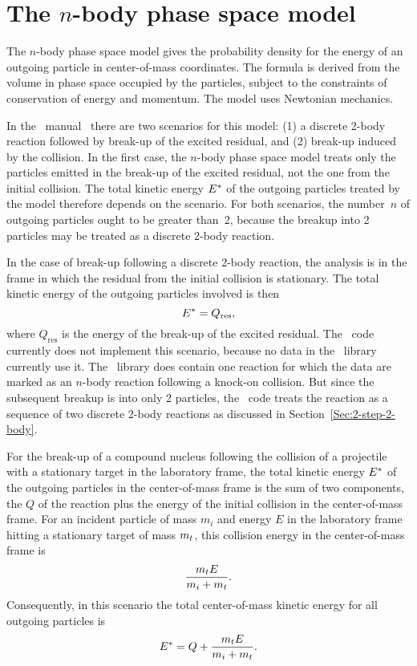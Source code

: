 \section{The $n$-body phase space model}
The $n$-body phase space model gives the probability density for
the energy of an outgoing particle in center-of-mass coordinates.
The formula is derived from the volume in phase space occupied
by the particles, subject to the constraints of conservation
of energy and momentum.  The model uses Newtonian mechanics.

In the \ENDF\ manual~\cite{ENDFB}
there are two scenarios for this model: (1) a discrete 2-body reaction
followed by break-up of the excited residual, and (2) break-up
induced by the collision.  In the first case, the $n$-body phase space
model treats only the particles emitted in the break-up of the excited
residual, not the one from the initial collision.  The total kinetic energy ${E^*}$
of the outgoing particles treated by the model therefore depends on
the scenario.  For both scenarios, the number~$n$ of outgoing particles
ought to be greater than~2, because the breakup into 2 particles may
be treated as a discrete 2-body reaction.

In the case of break-up following a discrete 2-body
reaction, the analysis is in the frame in which the residual from
the initial collision is stationary.  The total kinetic energy of the 
outgoing particles involved is then
$$
  {E^*} = Q_{\textrm{res}},
$$
where $Q_{\textrm{res}}$ is
the energy of the break-up of the excited residual.  The \gettransfer\ 
code currently does not implement this scenario, because no data
in the \ENDFdata\ library~\cite{ENDFdata} currently use it.
The \ENDFdata\ library does contain one reaction for which the data are marked
as an $n$-body reaction following a knock-on collision.  But since the subsequent
breakup is into only 2 particles, the \gettransfer\ code treats the reaction
as a sequence of two discrete 2-body reactions as discussed in
Section~\ref{Sec:2-step-2-body}.

For the break-up of a compound nucleus following the collision of a projectile
with a stationary target in the laboratory frame, the total kinetic energy ${E^*}$
of the outgoing particles in the center-of-mass frame is the sum of two
components, the $Q$ of the reaction plus the energy of the initial collision in the
center-of-mass frame.  For an incident
particle of mass $m_i$ and energy $E$ in the laboratory frame hitting a
stationary target of mass $m_t$, this collision energy in the center-of-mass frame is
$$
  \frac{m_t E}{m_i + m_t}.
$$
Consequently, in this scenario the total center-of-mass kinetic energy for all
outgoing particles is
\begin{equation}
  {E^*} = Q + \frac{m_t E}{m_i + m_t}.
  \label{def-Estar}
\end{equation}

